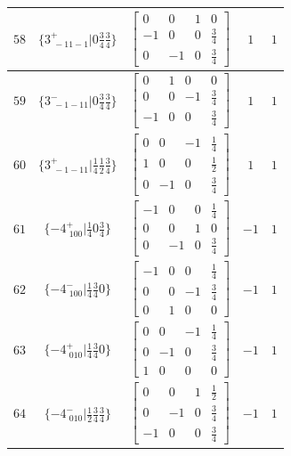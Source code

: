 \documentclass[fleqn,8pt]{jsarticle}
\begin{document}
\begin{longtable}{ccccc}
$ 58 $ & $ \{3^{+}_{\,\,-11-1}|0 \frac{3}{4} \frac{3}{4}\} $ & $ \begin{bmatrix} 0 & 0 & 1 & 0 \\ -1 & 0 & 0 & \frac{3}{4} \\ 0 & -1 & 0 & \frac{3}{4} \end{bmatrix} $ & $ 1 $ & $ 1 $ \\ \hline
$ 59 $ & $ \{3^{-}_{\,\,-1-11}|0 \frac{3}{4} \frac{3}{4}\} $ & $ \begin{bmatrix} 0 & 1 & 0 & 0 \\ 0 & 0 & -1 & \frac{3}{4} \\ -1 & 0 & 0 & \frac{3}{4} \end{bmatrix} $ & $ 1 $ & $ 1 $ \\ \hline
$ 60 $ & $ \{3^{+}_{\,\,-1-11}|\frac{1}{4} \frac{1}{2} \frac{3}{4}\} $ & $ \begin{bmatrix} 0 & 0 & -1 & \frac{1}{4} \\ 1 & 0 & 0 & \frac{1}{2} \\ 0 & -1 & 0 & \frac{3}{4} \end{bmatrix} $ & $ 1 $ & $ 1 $ \\ \hline
$ 61 $ & $ \{-4^{+}_{\,\,100}|\frac{1}{4} 0 \frac{3}{4}\} $ & $ \begin{bmatrix} -1 & 0 & 0 & \frac{1}{4} \\ 0 & 0 & 1 & 0 \\ 0 & -1 & 0 & \frac{3}{4} \end{bmatrix} $ & $ -1 $ & $ 1 $ \\ \hline
$ 62 $ & $ \{-4^{-}_{\,\,100}|\frac{1}{4} \frac{3}{4} 0\} $ & $ \begin{bmatrix} -1 & 0 & 0 & \frac{1}{4} \\ 0 & 0 & -1 & \frac{3}{4} \\ 0 & 1 & 0 & 0 \end{bmatrix} $ & $ -1 $ & $ 1 $ \\ \hline
$ 63 $ & $ \{-4^{+}_{\,\,010}|\frac{1}{4} \frac{3}{4} 0\} $ & $ \begin{bmatrix} 0 & 0 & -1 & \frac{1}{4} \\ 0 & -1 & 0 & \frac{3}{4} \\ 1 & 0 & 0 & 0 \end{bmatrix} $ & $ -1 $ & $ 1 $ \\ \hline
$ 64 $ & $ \{-4^{-}_{\,\,010}|\frac{1}{2} \frac{3}{4} \frac{3}{4}\} $ & $ \begin{bmatrix} 0 & 0 & 1 & \frac{1}{2} \\ 0 & -1 & 0 & \frac{3}{4} \\ -1 & 0 & 0 & \frac{3}{4} \end{bmatrix} $ & $ -1 $ & $ 1 $ \\ \hline

\end{longtable}
\end{document}
